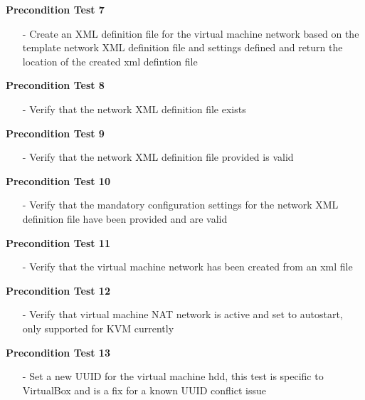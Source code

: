 \begin{description}
\item {\bf	 Precondition Test 7}
		\begin{itemize}
		\item[-]	Create an XML definition file for the virtual machine network based on the template network XML
						definition file and settings defined and return the location of the created xml defintion file
		\end{itemize}
		
\item {\bf	 Precondition Test 8}
		\begin{itemize}
		\item[-]	Verify that the network XML definition file exists
		\end{itemize}

\item {\bf	 Precondition Test 9}
		\begin{itemize}
		\item[-]	Verify that the network XML definition file provided is valid
		\end{itemize}
		
\item {\bf	 Precondition Test 10}
		\begin{itemize}
		\item[-]	Verify that the mandatory configuration settings for the network XML definition file have
						been provided and are valid
		\end{itemize}
		
\item {\bf	 Precondition Test 11}
		\begin{itemize}
		\item[-]	Verify that the virtual machine network has been created from an xml file
		\end{itemize}

\item {\bf	 Precondition Test 12}
		\begin{itemize}
		\item[-]	Verify that virtual machine NAT network is active and  set to autostart, only supported
						for KVM currently
		\end{itemize}
		
\item {\bf	 Precondition Test 13}
		\begin{itemize}
		\item[-]	Set a new UUID for the virtual machine hdd, this test is specific to VirtualBox and is
						a fix for a known UUID conflict issue
		\end{itemize}


\end{description}
